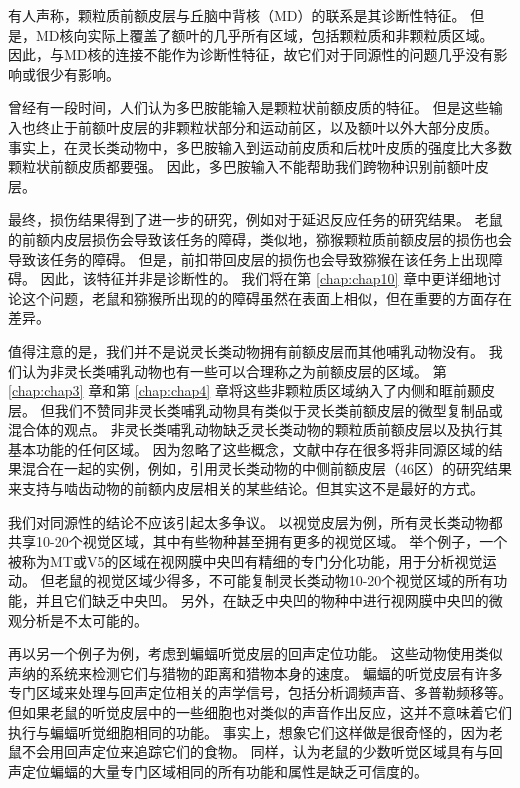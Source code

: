有人声称，颗粒质前额皮层与丘脑中背核（MD）的联系是其诊断性特征\cite{je1948orbitofrontal,akert1964comparative,uylings2003rats}。
但是，MD核向实际上覆盖了额叶的几乎所有区域，包括颗粒质和非颗粒质区域。
因此，与MD核的连接不能作为诊断性特征，故它们对于同源性的问题几乎没有影响或很少有影响。


曾经有一段时间，人们认为多巴胺能输入是颗粒状前额皮质的特征\cite{divac1978converging,porrino1982brainstem}。
但是这些输入也终止于前额叶皮层的非颗粒状部分和运动前区，以及额叶以外大部分皮质。
事实上，在灵长类动物中，多巴胺输入到运动前皮质和后枕叶皮质的强度比大多数颗粒状前额皮质都要强\cite{gaspar1992topography,williams1998widespread}。
因此，多巴胺输入不能帮助我们跨物种识别前额叶皮层。


最终，损伤结果得到了进一步的研究，例如对于延迟反应任务的研究结果。
老鼠的前额内皮层损伤会导致该任务的障碍\cite{kolb1974double}，类似地，猕猴颗粒质前额皮层的损伤也会导致该任务的障碍\cite{goldman1971analysis}。
但是，前扣带回皮层的损伤也会导致猕猴在该任务上出现障碍\cite{meunier1997effects}。
因此，该特征并非是诊断性的。
我们将在第 \ref{chap:chap10} 章中更详细地讨论这个问题，老鼠和猕猴所出现的的障碍虽然在表面上相似，但在重要的方面存在差异。


值得注意的是，我们并不是说灵长类动物拥有前额皮层而其他哺乳动物没有。
我们认为非灵长类哺乳动物也有一些可以合理称之为前额皮层的区域。
第 \ref{chap:chap3} 章和第 \ref{chap:chap4} 章将这些非颗粒质区域纳入了内侧和眶前颞皮层。
但我们不赞同非灵长类哺乳动物具有类似于灵长类前额皮层的微型复制品或混合体的观点。
非灵长类哺乳动物缺乏灵长类动物的颗粒质前额皮层以及执行其基本功能的任何区域。
因为忽略了这些概念，文献中存在很多将非同源区域的结果混合在一起的实例，例如，引用灵长类动物的中侧前额皮层（46区）的研究结果来支持与啮齿动物的前额内皮层相关的某些结论。但其实这不是最好的方式。


我们对同源性的结论不应该引起太多争议。
以视觉皮层为例，所有灵长类动物都共享10-20个视觉区域，其中有些物种甚至拥有更多的视觉区域\cite{kaas2020evolution}。
举个例子，一个被称为MT或V5的区域在视网膜中央凹有精细的专门分化功能，用于分析视觉运动。
但老鼠的视觉区域少得多\cite{rosa1999evolution,lyon200734}，不可能复制灵长类动物10-20个视觉区域的所有功能，并且它们缺乏中央凹。
另外，在缺乏中央凹的物种中进行视网膜中央凹的微观分析是不太可能的。


再以另一个例子为例，考虑到蝙蝠听觉皮层的回声定位功能。
这些动物使用类似声纳的系统来检测它们与猎物的距离和猎物本身的速度。
蝙蝠的听觉皮层有许多专门区域来处理与回声定位相关的声学信号，包括分析调频声音、多普勒频移等\cite{suga1997cortical,fitzpatrick1998distribution}。
但如果老鼠的听觉皮层中的一些细胞也对类似的声音作出反应，这并不意味着它们执行与蝙蝠听觉细胞相同的功能。
事实上，想象它们这样做是很奇怪的，因为老鼠不会用回声定位来追踪它们的食物。
同样，认为老鼠的少数听觉区域具有与回声定位蝙蝠的大量专门区域相同的所有功能和属性是缺乏可信度的。


